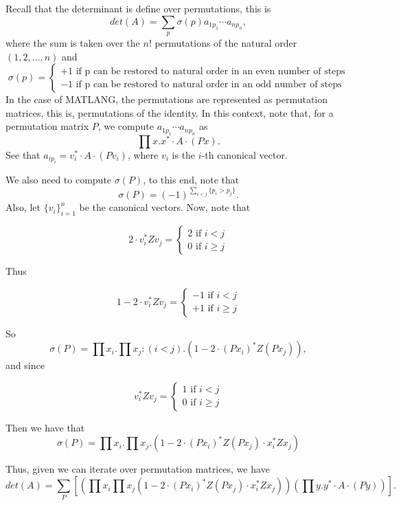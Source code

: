 Recall that the determinant is define over permutations, this is $$det(A)=\sum_{p}\sigma(p)a_{1p_1}\cdots a_{np_n},$$ where the sum is taken over the $n!$ permutations of the natural order $(1, 2,\ldots, n)$ and 
       \[
  			\sigma(p)=\begin{cases}
               +1 \text{ if p can be restored to natural order in an even number of steps} \\
               -1 \text{ if p can be restored to natural order in an odd number of steps}
            \end{cases}
		\]
In the case of MATLANG, the permutations are represented as permutation matrices, this is, permutations of the identity. In this context, note that, for a permutation matrix $P$, we compute $a_{1p_1}\cdots a_{np_n}$ as $$\prod x. x^*\cdot A\cdot (Px).$$ See that $a_{ip_i}=v_i^*\cdot A\cdot (Pv_i)$, where $v_i$ is the $i$-th canonical vector. 


We also need to compute $\sigma(P)$, to this end, note that $$\sigma(P)=(-1)^{\sum_{i<j}\lbrace p_i>p_j\rbrace}.$$ Also, let $\lbrace v_i\rbrace_{i=1}^{n}$ be the canonical vectors.
Now, note that 

 		\[
  			2\cdot v_i^*Zv_j=\begin{cases}
               2 \text{ if } i < j \\
               0 \text{ if } i \geq j
            \end{cases}
		\]
		
Thus

		\[
  			1-2\cdot v_i^*Zv_j=\begin{cases}
               -1 \text{ if } i < j \\
               +1 \text{ if } i \geq j
            \end{cases}
		\]

So $$\sigma(P)=\prod x_i.\prod x_j:(i<j).\left(1-2\cdot (Px_i)^*Z(Px_j)\right),$$ and since 

		\[
  			v_i^*Zv_j=\begin{cases}
               1 \text{ if } i < j \\
               0 \text{ if } i \geq j
            \end{cases}
		\]

Then we have that $$\sigma(P)=\prod x_i.\prod x_j.\left(1-2\cdot (Px_i)^*Z(Px_j)\cdot x_i^*Zx_j\right)$$

Thus, given we can iterate over permutation matrices, we have $$det(A)=\sum_{P}\left[\left(\prod x_i \prod x_j \left(1-2\cdot (Px_i)^*Z(Px_j)\cdot x_i^*Zx_j\right)\right)\left(\prod y. y^*\cdot A\cdot (Py)\right)\right].$$

